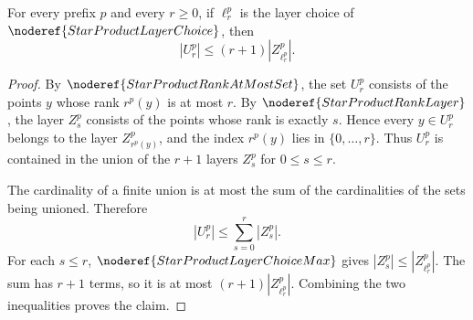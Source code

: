 \begin{lemma}
For every prefix \(p\) and every \(r\ge0\), if
\(\ell_r^p\) is the layer choice of \(\noderef{StarProductLayerChoice}\),
then
\[
  |U_r^p|\le (r+1)|Z_{\ell_r^p}^p|.
\]
\end{lemma}
\begin{proof}
By \(\noderef{StarProductRankAtMostSet}\), the set \(U_r^p\) consists of
the points \(y\) whose rank \(r^p(y)\) is at most \(r\).  By
\(\noderef{StarProductRankLayer}\), the layer \(Z_s^p\) consists of the
points whose rank is exactly \(s\).  Hence every \(y\in U_r^p\) belongs to
the layer \(Z_{r^p(y)}^p\), and the index \(r^p(y)\) lies in
\(\{0,\ldots,r\}\).  Thus \(U_r^p\) is contained in the union of the
\(r+1\) layers \(Z_s^p\) for \(0\le s\le r\).

The cardinality of a finite union is at most the sum of the cardinalities of
the sets being unioned.  Therefore
\[
  |U_r^p|\le \sum_{s=0}^r |Z_s^p|.
\]
For each \(s\le r\), \(\noderef{StarProductLayerChoiceMax}\) gives
\(|Z_s^p|\le |Z_{\ell_r^p}^p|\).  The sum has \(r+1\) terms, so it is at
most \((r+1)|Z_{\ell_r^p}^p|\).  Combining the two inequalities proves the
claim.
\end{proof}

